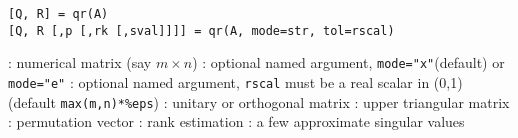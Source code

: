 
\begin{mandesc}
\end{mandesc}

\begin{calling_sequence}
\begin{verbatim}
[Q, R] = qr(A)
[Q, R [,p [,rk [,sval]]]] = qr(A, mode=str, tol=rscal)
\end{verbatim}
\end{calling_sequence}
\begin{parameters}
  \begin{varlist}
    :  numerical matrix (say $m \times n$)
    : optional named argument, \verb+mode="x"+(default) or \verb+mode="e"+
    : optional named argument, \verb+rscal+ must be a real scalar in (0,1) (default \verb+max(m,n)*%eps+)
    : unitary or orthogonal matrix
    : upper triangular matrix
    : permutation vector
    : rank estimation
    : a few approximate singular values
  \end{varlist}
\end{parameters}

